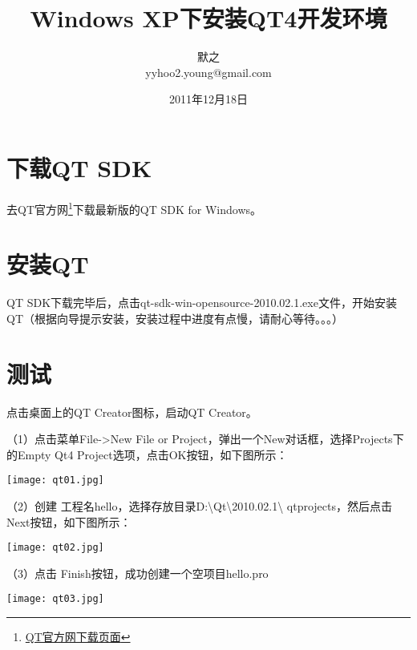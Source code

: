\documentclass[a4paper, 12pt]{article}
\begin{document}
\setlength{\parindent}{2em}                    

\title{Windows XP下安装QT4开发环境}
\author{默之\\\textrm{yyhoo2.young@gmail.com}}
\date{2011年12月18日}
\maketitle

\section{下载QT SDK}
去QT官方网\footnote{\href{http://qt.nokia.com/downloads}{QT官方网下载页面}}下载最新版的QT SDK for Windows。

\section{安装QT}

QT SDK下载完毕后，点击qt-sdk-win-opensource-2010.02.1.exe文件，开始安装QT（根据向导提示安装，安装过程中进度有点慢，请耐心等待。。。）

\section{测试}
点击桌面上的QT Creator图标，启动QT Creator。

（1）点击菜单File->New File or Project，弹出一个New对话框，选择Projects下的Empty Qt4 Project选项，点击OK按钮，如下图所示：

\begin{center}
  \setlength{\abovecaptionskip}{0pt}    
  \setlength{\belowcaptionskip}{10pt}
  \texttt{[image: qt01.jpg]}
\end{center}


（2）创建 工程名hello，选择存放目录D:\textbackslash Qt\textbackslash 2010.02.1\textbackslash
qtprojects，然后点击Next按钮，如下图所示：

\begin{center}
  \setlength{\abovecaptionskip}{0pt}    
  \setlength{\belowcaptionskip}{10pt}
  \texttt{[image: qt02.jpg]}
\end{center}

（3）点击 Finish按钮，成功创建一个空项目hello.pro

\begin{center}
  \setlength{\abovecaptionskip}{0pt}    
  \setlength{\belowcaptionskip}{10pt}
  \texttt{[image: qt03.jpg]}
\end{center}
\end{document}
